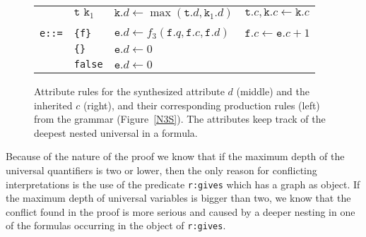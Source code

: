 \begin{figure}
\begin{center}
\begin{tabular}{llll}
&$\texttt{t k}_1$              & $\texttt{k}.d \leftarrow \max(\texttt{t}.d, \texttt{k}_1.d)$ & $\texttt{t}.c, \texttt{k}.c \leftarrow \texttt{k}.c$\\
&&\\
\texttt{e::=}&\texttt{\{f\}} &  $\texttt{e}.d \leftarrow f_3 (\texttt{f}.q ,\texttt{f}.c, \texttt{f}.d )$&   $\texttt{f}.c \leftarrow \texttt{e}.c+1$           \\
       &\texttt{\{\}}        &  $\texttt{e}.d \leftarrow 0$ & \\
       &\texttt{false}       &  $\texttt{e}.d \leftarrow 0$&   \\
  \hline
\end{tabular}
\normalsize
\caption{Attribute rules for the synthesized attribute $d$ (middle) and the inherited $c$ (right), and their corresponding production rules (left) 
from the \nthree grammar (Figure~\ref{N3S}).
The attributes keep track of the deepest nested universal in a formula.
\label{neval}}
\end{center}
\end{figure}

Because of the nature of the proof we know that if the maximum depth of the universal quantifiers is two or lower, then the only reason for conflicting interpretations 
is the use of the 
predicate \texttt{r:gives} which has a graph as object. If the maximum depth of universal variables is bigger than two, 
we know that the conflict 
 found in the proof is more serious and caused by a deeper nesting in one of the formulas occurring in the object of \texttt{r:gives}.
 

% 









